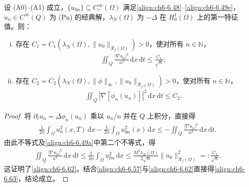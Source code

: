 \documentclass[../../main.tex]{subfiles}%
\begin{document}
\begin{lemma}[梯度的两个加权估计]\label{lemma:ch06-6.5.5}
设 (A0)--(A1) 成立，$\{u_{0n}\}\subseteq C^\infty_c(\Omega)$ 满足\eqref{align:ch6-6.48}--\eqref{align:ch6-6.49e}，$u_n\in C^\infty(Q)$ 为 (Pn) 的经典解，$\lambda_N(\Omega)$ 为 $-\Delta$ 在 $H^1_0(\Omega)$ 上的第一特征值。则：
\begin{enumerate}[(i)]
\item 存在 $C_1=C_1(\lambda_N(\Omega),\|u_0\|_{\mathscr{R}_f(\Omega)})>0$，使对所有 $n\in\mathbb{N}$，
\begin{align}
\iint_Q\frac{|\nabla u_n|^2}{n^2}\,\mathrm{d}x\,\mathrm{d}t\leqslant\frac{C_1}{\sqrt{n}}; \label{align:ch6-6.62}
\end{align}
\item 存在 $C_2=C_2(\lambda_N(\Omega),\|\phi\|_\infty,\|u_0\|_{\mathscr{R}_f(\Omega)})>0$，使对所有 $n\in\mathbb{N}$，
\begin{align}
\iint_Q|\nabla[\phi_n(u_n)]|^2\,\mathrm{d}x\,\mathrm{d}t\leqslant C_2. \label{align:ch6-6.63}
\end{align}
\end{enumerate}
\end{lemma}

\begin{proof}
将 $\partial_tu_n=\Delta\phi_n(u_n)$ 乘以 $u_n/n$ 并在 $Q$ 上积分，直接得
\begin{align*}
\frac{1}{2n}\int_\Omega u_n^2(x,T)\,\mathrm{d}x-\frac{1}{2n}\int_\Omega u_{0n}^2(x)\,\mathrm{d}x
\leqslant-\iint_Q\frac{|\nabla u_n|^2}{n^2}\,\mathrm{d}x\,\mathrm{d}t.
\end{align*}
由此不等式及\eqref{align:ch6-6.49a}中第二个不等式，得
\begin{align*}
\iint_Q\frac{|\nabla u_n|^2}{n^2}\,\mathrm{d}x\,\mathrm{d}t
\leqslant\frac{1}{2n}\int_\Omega u_{0n}^2\,\mathrm{d}x
\leqslant\frac{M^2\lambda_N(\Omega)}{2\sqrt{n}}\|u_0\|_{\mathscr{R}_f(\Omega)}^2
=:\frac{C_1}{\sqrt{n}}.
\end{align*}
这证明了\eqref{align:ch6-6.62}。结合\eqref{align:ch6-6.57}与\eqref{align:ch6-6.62}直接得\eqref{align:ch6-6.63}，结论成立。
\end{proof}
\end{document}
